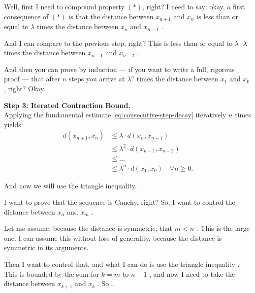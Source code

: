 \begin{proofWrapper}
\begin{speech}[00:28:27 - 00:30:11]
Well, first I need to compound property $(*)$, right? I need to say: okay, a first consequence of $(*)$ is that the distance between $x_{n+1}$ and $x_n$ is less than or equal to $\lambda$ times the distance between $x_n$ and $x_{n-1}$ .

And I can compare to the previous step, right? This is less than or equal to $\lambda \cdot \lambda$ times the distance between $x_{n-1}$ and $x_{n-2}$ .

And then you can prove by induction --- if you want to write a full, rigorous proof --- that after $n$ steps you arrive at $\lambda^n$ times the distance between $x_1$ and $x_0$ , right? Okay.
\end{speech}

\begin{content}
\textbf{Step 3: Iterated Contraction Bound.} \\
Applying the fundamental estimate \eqref{eq:consecutive-step-decay} iteratively $n$ times yields:
\begin{align}
d(x_{n+1}, x_n) &\le \lambda \cdot d(x_n, x_{n-1}) \nonumber \\
&\le \lambda^2 \cdot d(x_{n-1}, x_{n-2}) \nonumber \\
&\le \dots \nonumber \\
&\le \lambda^n \cdot d(x_1, x_0) \quad \forall n \ge 0. \label{eq:iterated-contraction-bound}
\end{align}
\end{content}

\begin{speech}[00:30:11 - 00:31:57]
And now we will use the triangle inequality.

I want to prove that the sequence is Cauchy, right? So, I want to control the distance between $x_n$ and $x_m$ .

Let me assume, because the distance is symmetric, that $m < n$ . This is the large one. I can assume this without loss of generality, because the distance is symmetric in its arguments.

Then I want to control that, and what I can do is use the triangle inequality . This is bounded by the sum for $k = m$ to $n-1$ , and now I need to take the distance between $x_{k+1}$ and $x_k$ . So...
\end{speech}


\end{proofWrapper}
